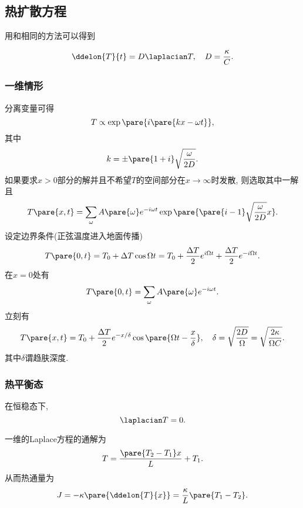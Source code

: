 \documentclass[../Thermal.tex]{subfiles}
\begin{document}
\subsection{热扩散方程}
用和相同的方法可以得到
\begin{finale}
\[ \ddelon{T}{t} = D\laplacian T, \quad D = \frac{\kappa}{C}. \]
\end{finale}
\subsubsection{一维情形}
分离变量可得
\[ T \propto \exp\pare{i\pare{kx-\omega t}}, \]
其中
\[ k = \pm\pare{1+i}\sqrt{\frac{\omega}{2D}}. \]
如果要求$x>0$部分的解并且不希望$T$的空间部分在$x\rightarrow\infty$时发散, 则选取其中一解且
\[ T\pare{x,t} = \sum_\omega A\pare{\omega} e^{-i\omega t}\exp\pare{\pare{i-1}\sqrt{\frac{\omega}{2D}}x}. \]
设定边界条件(正弦温度进入地面传播)
\[ T\pare{0,t} = T_0 + \Delta T \cos \Omega t = T_0 + \frac{\Delta T}{2} e^{i\Omega t} + \frac{\Delta T}{2} e^{-i \Omega t}. \]
在$x=0$处有
\[ T\pare{0,t} = \sum_\omega A\pare{\omega} e^{-i\omega t}. \]
立刻有
\begin{equation}
\label{eq:skindelta}
T\pare{x,t} = T_0 + \frac{\Delta T}{2}e^{-x/\delta}\cos\pare{\Omega t - \frac{x}{\delta}}, \quad \delta = \sqrt{\frac{2D}{\Omega}} = \sqrt{\frac{2\kappa}{\Omega C}}.
\end{equation}
其中$\delta$谓趋肤深度.
\subsubsection{热平衡态}
在恒稳态下,
\[ \laplacian T = 0. \]
\begin{ex}
一维的Laplace方程的通解为
\[ T = \frac{\pare{T_2 - T_1}x}{L} + T_1. \]
从而热通量为
\[ J = -\kappa\pare{\ddelon{T}{x}} = \frac{\kappa}{L}\pare{T_1 - T_2}. \]
\end{ex}
\end{document}
